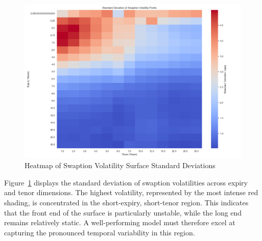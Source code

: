\begin{figure}[H]
	\centering
	\includegraphics[width=1\textwidth]{images/descriptive_data_analysis/vol_surface_std_heatmap.png}
	\caption{Heatmap of Swaption Volatility Surface Standard Deviations}
	\label{fig:vol_surface_std_heatmap}
\end{figure}

Figure~\ref{fig:vol_surface_std_heatmap} displays the standard deviation of swaption volatilities across expiry and tenor dimensions. The highest volatility, represented by the most intense red shading, is concentrated in the short-expiry, short-tenor region. This indicates that the front end of the surface is particularly unstable, while the long end remains relatively static. A well-performing model must therefore excel at capturing the pronounced temporal variability in this region.

